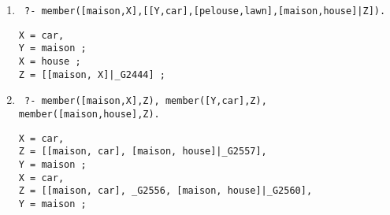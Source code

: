 \documentclass{article}
\begin{document}
\begin{enumerate}
\begin{enumerate}
\item \begin{verbatim} ?- member([maison,X],[[Y,car],[pelouse,lawn],[maison,house]|Z]). \end{verbatim}
\begin{lstlisting}
X = car,
Y = maison ;
X = house ;
Z = [[maison, X]|_G2444] ;
\end{lstlisting}

\item \begin{verbatim} ?- member([maison,X],Z), member([Y,car],Z), member([maison,house],Z). \end{verbatim}
\begin{lstlisting}
X = car,
Z = [[maison, car], [maison, house]|_G2557],
Y = maison ;
X = car,
Z = [[maison, car], _G2556, [maison, house]|_G2560],
Y = maison ;
\end{lstlisting}
\end{enumerate}

\end{enumerate}
\end{document}
